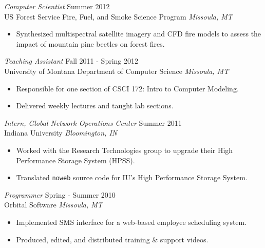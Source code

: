 \documentclass[line,margin]{res}
\begin{document}
\begin{resume}
        {\sl Computer Scientist} \hfill  Summer 2012\\
        US Forest Service Fire, Fuel, and Smoke Science Program \hfill {\sl Missoula, MT}
        \begin{itemize} \itemsep -2pt
            \item Synthesized multispectral satellite imagery and CFD fire models to assess the impact of mountain pine beetles on forest fires.
        \end{itemize}

        {\sl Teaching Assistant} \hfill  Fall 2011 - Spring 2012\\
        University of Montana Department of Computer Science \hfill {\sl Missoula, MT}
        \begin{itemize} \itemsep -2pt
            \item Responsible for one section of CSCI 172: Intro to Computer Modeling.
            \item Delivered weekly lectures and taught lab sections.
        \end{itemize}

        {\sl Intern, Global Network Operations Center} \hfill  Summer 2011\\
        Indiana University \hfill {\sl Bloomington, IN}
        \begin{itemize} \itemsep -2pt
            \item Worked with the Research Technologies group to upgrade their High Performance Storage System (HPSS).
            \item Translated \verb!noweb! source code for IU's High Performance Storage System.
        \end{itemize}

        {\sl Programmer} \hfill Spring - Summer 2010\\
        Orbital Software \hfill {\sl Missoula, MT}
        \begin{itemize} \itemsep -2pt
            \item Implemented SMS interface for a web-based employee scheduling system.
            \item Produced, edited, and distributed training \& support videos.
        \end{itemize}



\end{resume}
\end{document}
